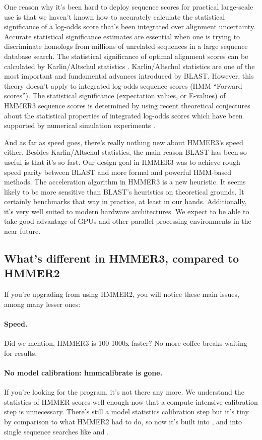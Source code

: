 One reason why it's been hard to deploy sequence scores for practical
large-scale use is that we haven't known how to accurately calculate
the statistical significance of a log-odds score that's been
integrated over alignment uncertainty. Accurate statistical
significance estimates are essential when one is trying to
discriminate homologs from millions of unrelated sequences in a large
sequence database search. The statistical significance of optimal
alignment scores can be calculated by Karlin/Altschul statistics
\citep{Karlin90,KarlinAltschul93}. Karlin/Altschul statistics are one
of the most important and fundamental advances introduced by BLAST.
However, this theory doesn't apply to integrated log-odds sequence
scores (HMM ``Forward scores'').  The statistical significance
(expectation values, or E-values) of HMMER3 sequence scores is
determined by using recent theoretical conjectures about the
statistical properties of integrated log-odds scores which have been
supported by numerical simulation experiments \citep{Eddy08}.

And as far as speed goes, there's really nothing new about HMMER3's
speed either. Besides Karlin/Altschul statistics, the main reason
BLAST has been so useful is that it's so fast.  Our design goal in
HMMER3 was to achieve rough speed parity between BLAST and more formal
and powerful HMM-based methods.  The acceleration algorithm in HMMER3
is a new heuristic. It seems likely to be more sensitive than BLAST's
heuristics on theoretical grounds. It certainly benchmarks that way in
practice, at least in our hands. Additionally, it's very well suited
to modern hardware architectures. We expect to be able to take good
advantage of GPUs and other parallel processing environments in the
near future.

\subsection{What's different in HMMER3, compared to HMMER2}

If you're upgrading from using HMMER2, you will notice these main
issues, among many lesser ones:

\paragraph{Speed.} Did we mention, HMMER3 is 100-1000x faster? No more
coffee breaks waiting for results.

\paragraph{No model calibration: hmmcalibrate is gone.} If you're looking for the
 program, it's not there any more. We understand
the statistics of HMMER scores well enough now that a
compute-intensive calibration step is unnecessary. There's still a
model statistics calibration step but it's tiny by comparison to what
HMMER2 had to do, so now it's built into , and into
single sequence searches like  and .

